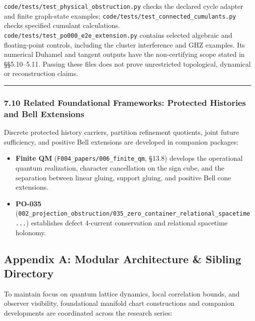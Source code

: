 \documentclass[
  11pt,
]{article}
\providecommand{\tightlist}{%
  \setlength{\itemsep}{0pt}\setlength{\parskip}{0pt}}
\providecommand{\tightlist}{%
  \setlength{\itemsep}{0pt}\setlength{\parskip}{0pt}}
\begin{document}
\texttt{code/tests/test\_physical\_obstruction.py} checks the declared cycle adapter
and finite graph-state examples; \texttt{code/tests/test\_connected\_cumulants.py}
checks specified cumulant calculations. \texttt{code/tests/test\_po000\_e2e\_extension.py}
contains selected algebraic and floating-point controls, including the
cluster interference and GHZ examples. Its numerical Duhamel and tangent
outputs have the non-certifying scope stated in §§5.10--5.11. Passing these
files does not prove unrestricted topological, dynamical or reconstruction
claims.

\begin{center}\rule{0.5\linewidth}{0.5pt}\end{center}

\subsubsection{7.10 Related Foundational Frameworks: Protected Histories and Bell Extensions}\label{related-foundational-frameworks-protected-histories-and-bell-extensions}

Discrete protected history carriers, partition refinement quotients, joint future sufficiency, and positive Bell extensions are developed in companion packages:

\begin{itemize}
\tightlist
\item
  \textbf{Finite QM} (\texttt{F004\_papers/006\_finite\_qm}, §13.8) develops the operational quantum realization, character cancellation on the sign cube, and the separation between linear gluing, support gluing, and positive Bell cone extensions.
\item
  \textbf{PO-035} (\texttt{002\_projection\_obstruction/035\_zero\_container\_relational\_spacetime...}) establishes defect 4-current conservation and relational spacetime holonomy.
\end{itemize}

\subsection{Appendix A: Modular Architecture \& Sibling Directory}\label{appendix-a-modular-architecture-sibling-directory}

To maintain focus on quantum lattice dynamics, local correlation bounds, and observer visibility, foundational manifold chart constructions and companion developments are coordinated across the research series:
\end{document}
